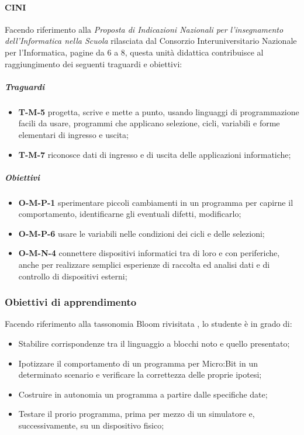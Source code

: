 \documentclass[../../relazione.tex]{subfiles}
\begin{document}
\paragraph{CINI}
Facendo riferimento alla \textit{Proposta di Indicazioni Nazionali per l'insegnamento dell'Informatica nella Scuola} \cite{CINI} rilasciata dal Consorzio Interuniversitario Nazionale per l'Informatica, pagine da 6 a 8, questa unità didattica contribuisce al raggiungimento dei seguenti traguardi e obiettivi:
\subparagraph{Traguardi}
\begin{itemize}
	\item \textbf{T-M-5} progetta, scrive e mette a punto, usando linguaggi di programmazione facili da usare, programmi che applicano selezione, cicli, variabili e forme elementari di ingresso e uscita;
	\item \textbf{T-M-7} riconosce dati di ingresso e di uscita delle applicazioni informatiche;
\end{itemize}
\subparagraph{Obiettivi}
\begin{itemize}
	\item \textbf{O-M-P-1} sperimentare piccoli cambiamenti in un programma per capirne il comportamento, identificarne gli eventuali difetti, modificarlo;
	\item \textbf{O-M-P-6} usare le variabili nelle condizioni dei cicli e delle selezioni;
	\item \textbf{O-M-N-4} connettere dispositivi informatici tra di loro e con periferiche, anche per realizzare semplici esperienze di raccolta ed analisi dati e di controllo di dispositivi esterni;
\end{itemize}

\subsubsection{Obiettivi di apprendimento}
Facendo riferimento alla tassonomia Bloom rivisitata \cite{BLOOM}, lo studente è in grado di:
\begin{itemize}
	\item Stabilire corrispondenze tra il linguaggio a blocchi noto e quello presentato;
	\item Ipotizzare il comportamento di un programma per Micro:Bit in un determinato scenario e verificare la correttezza delle proprie ipotesi;
	\item Costruire in autonomia un programma a partire dalle specifiche date;
	\item Testare il prorio programma, prima per mezzo di un simulatore e, successivamente, su un dispositivo fisico;
\end{itemize}
\end{document}
